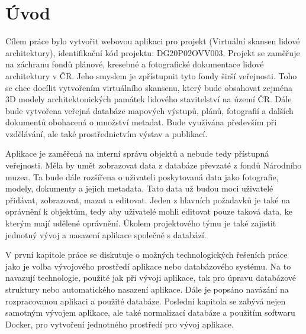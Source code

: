 \chapter*{Úvod}
\label{0-uvod}

Cílem práce bylo vytvořit webovou aplikaci pro projekt 
(Virtuální skansen lidové architektury), identifikační kód projektu:
DG20P02OVV003. Projekt se zaměřuje na záchranu fondů plánové, kresebné
a fotografické dokumentace lidové architektury v ČR. Jeho smyslem je
zpřístupnit tyto fondy širší veřejnosti. Toho se chce docílit
vytvořením virtuálního skansenu, který bude obsahovat zejména 3D
modely architektonických památek lidového stavitelství na území
ČR. Dále bude vytvořena veřejná databáze mapových výstupů, plánů,
fotografií a dalších dokumentů obohacená o množství metadat. Bude
využívána především při vzdělávání, ale také prostřednictvím výstav a
publikací.

Aplikace je zaměřená na interní správu objektů a nebude tedy přístupná
veřej\-nosti. Měla by umět zobrazovat data z databáze převzaté
z fondů Národního muzea. Ta bude dále rozšířena o uživateli poskytovaná
data jako fotografie, modely, dokumenty a jejich metadata. Tato data
už budou moci uživatelé přidávat, zobrazovat, mazat a editovat. Jeden
z hlavních požadavků je také na oprávnění k objektům, tedy aby
uživatelé mohli editovat pouze taková data, ke kterým mají udělené
oprávnění. Úkolem projektového týmu je také zajistit jednotný vývoj a nasazení 
aplikace společně s databází.

V první kapitole práce se diskutuje o možných technologických řešeních práce jako 
je volba vývojového prostředí aplikace nebo databázového systému. Na to navazují 
technologie, použité jak při vývoji aplikace, tak pro úpravu databázové struktury nebo 
automatického nasazení aplikace. Dále je popsáno navázání na rozpracovanou aplikaci a
použité databáze. Poslední kapitola se zabývá nejen samotným vývojem aplikace, ale také 
normalizací databáze a použitím softwaru Docker, pro vytvoření jednotného prostředí pro 
vývoj aplikace.



